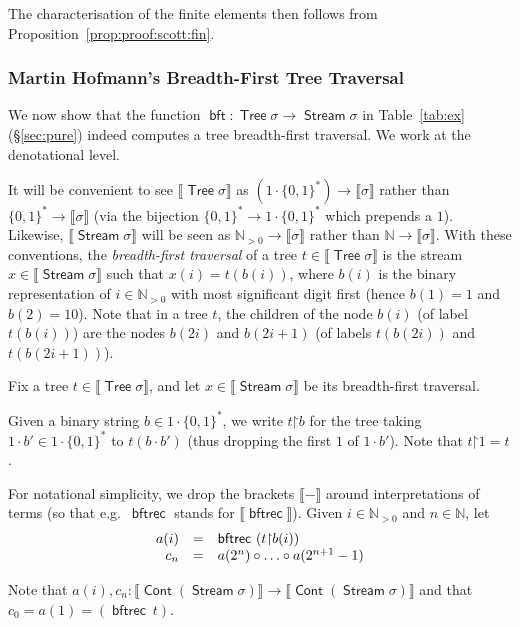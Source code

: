 \documentclass[%
  a4paper,
  UKenglish,
  cleveref,
  autoref,
  thm-restate,
  numberwithinsect,
]{lipics-v2021}
\newcommand\restr{\mathord{\upharpoonright}}	%
\newcommand\NN{\mathbb{N}}
\newcommand\two{\mathbf{2}}
\newcommand\I[1]{\llbracket #1 \rrbracket} %
\newcommand\comp{\mathbin\circ}
\newcommand\term[1]{\mathsf{#1}}
\newcommand\type[1]{\term{#1}}
\newcommand\bft{\mathop{\term{bft}}}
\newcommand\bftrec{\mathop{\term{bftrec}}}
\newcommand\arrow\to
\newcommand\Stream{\mathop{\type{Stream}}}
\newcommand\Tree{\mathop{\type{Tree}}}
\newcommand\Cont{\mathop{\type{Cont}}}
\newcommand\PTbis{\sigma}	%
\begin{document}
The characterisation of the finite elements then follows from
Proposition~\ref{prop:proof:scott:fin}.

\subsubsection{Martin Hofmann's Breadth-First Tree Traversal}
\label{sec:proof:sem:stream-tree:bft}

We now show that the function
$\bft \colon \Tree\PTbis \arrow \Stream\PTbis$
in Table~\ref{tab:ex} (\S\ref{sec:pure})
indeed computes a tree breadth-first traversal.
We work at the denotational level.

It will be convenient to see $\I{\Tree\PTbis}$
as $(1 \cdot \{0,1\}^*) \to \I\PTbis$
rather than $\{0,1\}^* \to \I\PTbis$
(via the bijection $\{0,1\}^* \to 1 \cdot \{0,1\}^*$ which prepends a $1$).
Likewise, $\I{\Stream\PTbis}$
will be seen as $\NN_{>0} \to \I\PTbis$ rather than
$\NN \to \I\PTbis$.
With these conventions, the \emph{breadth-first traversal}
of a tree $t \in \I{\Tree\PTbis}$
is the stream $x \in \I{\Stream\PTbis}$
such that $x(i) = t(b(i))$,
where $b(i)$ is the binary representation of $i \in \NN_{>0}$
with most significant digit first
(hence $b(1) = 1$ and $b(2) = 10$).
Note that %
in a tree $t$,
the children of the node $b(i)$ (of label $t(b(i))$)
are the nodes $b(2i)$ and $b(2i+1)$
(of labels $t(b(2i))$ and $t(b(2i+1))$).


Fix a tree $t \in \I{\Tree\PTbis}$,
and let $x \in \I{\Stream\PTbis}$ be its breadth-first traversal.

Given a binary string $b \in 1 \cdot\{0,1\}^*$,
we write $t \restr b$ for the tree taking $1 \cdot b' \in 1 \cdot \{0,1\}^*$
to $t(b \cdot b')$ (thus dropping the first $1$ of $1 \cdot b'$).
Note that $t\restr 1 = t$.

For notational simplicity, we drop the brackets $\I{-}$
around interpretations of terms
(so that e.g.\ $\bftrec$ stands for $\I\bftrec$).
Given $i \in \NN_{>0}$ and $n \in \NN$,
let
\[
\begin{array}{r c l}
  a(i)
& =
& \bftrec\ (t \restr b(i))
\\
%
  c_n
& =
& a(2^n) \comp \dots \comp a(2^{n+1}-1)
\end{array}
\]

\noindent
Note that
\(
  a(i), c_n \colon
  \I{\Cont(\Stream \PTbis)}
  \to
  \I{\Cont(\Stream \PTbis)}
\)
and that $c_0 = a(1) = (\bftrec\ t)$.
\end{document}
